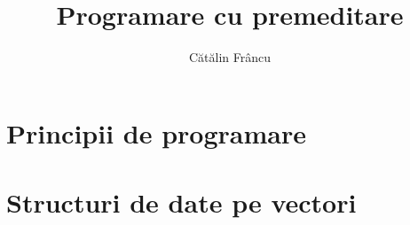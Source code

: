 \documentclass[12pt,openany]{book}
\title{Programare cu premeditare}
\author{Cătălin Frâncu}
\date{}
\begin{document}
\pagestyle{plain}

\hypersetup{pageanchor=false}

\begin{titlepage}
\maketitle
\end{titlepage}

\hypersetup{pageanchor=true}
\cleardoublepage

\mainmatter



\pagestyle{fancy}

\raggedbottom

\begingroup
\hypersetup{hidelinks} %
\tableofcontents
\endgroup

\cleardoublepage

\part{Principii de programare}





\part{Structuri de date pe vectori}























\end{document}
